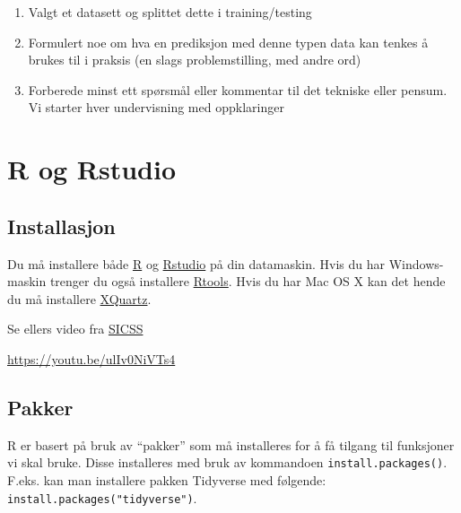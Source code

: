 \documentclass[
  letterpaper,
  DIV=11,
  numbers=noendperiod]{scrreprt}
\providecommand{\tightlist}{%
  \setlength{\itemsep}{0pt}\setlength{\parskip}{0pt}}\usepackage{longtable,booktabs,array}
\theoremstyle{definition}
\theoremstyle{remark}
\begin{document}
\begin{enumerate}
\def\labelenumi{\arabic{enumi})}
\tightlist
\item
  Valgt et datasett og splittet dette i training/testing
\item
  Formulert noe om hva en prediksjon med denne typen data kan tenkes å
  brukes til i praksis (en slags problemstilling, med andre ord)
\item
  Forberede minst ett spørsmål eller kommentar til det tekniske eller
  pensum. Vi starter hver undervisning med oppklaringer
\end{enumerate}


\hypertarget{r-og-rstudio}{%
\chapter*{R og Rstudio}\label{r-og-rstudio}}


\hypertarget{installasjon}{%
\section*{Installasjon}\label{installasjon}}


Du må installere både \href{https://www.r-project.org/}{R} og
\href{https://posit.co/products/open-source/rstudio/}{Rstudio} på din
datamaskin. Hvis du har Windows-maskin trenger du også installere
\href{https://cran.r-project.org/bin/windows/Rtools/rtools42/rtools.html}{Rtools}.
Hvis du har Mac OS X kan det hende du må installere
\href{https://www.xquartz.org/}{XQuartz}.

Se ellers video fra \href{https://youtu.be/ulIv0NiVTs4}{SICSS}

\url{https://youtu.be/ulIv0NiVTs4}

\hypertarget{pakker}{%
\section*{Pakker}\label{pakker}}


R er basert på bruk av ``pakker'' som må installeres for å få tilgang
til funksjoner vi skal bruke. Disse installeres med bruk av kommandoen
\texttt{install.packages()}. F.eks. kan man installere pakken Tidyverse
med følgende: \texttt{install.packages("tidyverse")}.
\end{document}
